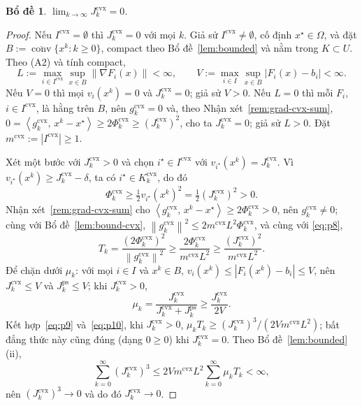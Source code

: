 \documentclass[]{interact}
\theoremstyle{plain}
\newtheorem{lemma}[theorem]{Bổ đề}
\theoremstyle{definition}
\theoremstyle{remark}
\newcommand{\norm}[1]{\left\lVert #1 \right\rVert}
\newcommand{\abs}[1]{\left\lvert #1 \right\rvert}
\newcommand{\inner}[2]{\left\langle #1,\, #2 \right\rangle}
\DeclareMathOperator{\conv}{conv}
\newcommand{\cvx}{\mathrm{cvx}}
\newcommand{\ps}{\mathrm{ps}}
\begin{document}
\begin{lemma}\label{lem:jcvx0}
$\displaystyle\lim_{k\to\infty}J^{\cvx}_k=0$.
\end{lemma}
\begin{proof}
Nếu $I^{\cvx}=\emptyset$ thì $J^{\cvx}_k=0$ với mọi $k$. Giả sử $I^{\cvx}\ne\emptyset$, cố định
$x^\star\in\Omega$, và đặt $B:=\overline{\conv}\{x^k:k\ge0\}$, compact theo Bổ đề~\ref{lem:bounded} và nằm
trong $K\subset U$. Theo (A2) và
tính compact,
\[
L:=\max_{i\in I^{\cvx}}\sup_{x\in B}\norm{\nabla F_i(x)}<\infty,\qquad
V:=\max_{i\in I}\sup_{x\in B}\abs{F_i(x)-b_i}<\infty.
\]
Nếu $V=0$ thì mọi $v_i(x^k)=0$ và
$J^{\cvx}_k=0$; giả sử $V>0$. Nếu $L=0$ thì mỗi $F_i$, $i\in I^{\cvx}$, là hằng trên
$B$, nên $g^{\cvx}_k=0$ và, theo Nhận xét~\ref{rem:grad-cvx-sum},
$0=\inner{g^{\cvx}_k}{x^k-x^\star}\ge 2\Phi^{\cvx}_k\ge(J^{\cvx}_k)^2$, cho ta
$J^{\cvx}_k=0$; giả sử $L>0$. Đặt $m^{\cvx}:=\abs{I^{\cvx}}\ge1$.

Xét một bước với $J^{\cvx}_k>0$ và chọn $i^\star\in I^{\cvx}$ với
$v_{i^\star}(x^k)=J^{\cvx}_k$. Vì $v_{i^\star}(x^k)\ge J^{\cvx}_k-\delta$, ta có
$i^\star\in K^{\cvx}_k$, do đó
\begin{equation}\label{eq:p8}
\Phi^{\cvx}_k\ge\tfrac12 v_{i^\star}(x^k)^2=\tfrac12(J^{\cvx}_k)^2>0 .
\end{equation}
Nhận xét~\ref{rem:grad-cvx-sum} cho
$\inner{g^{\cvx}_k}{x^k-x^\star}\ge2\Phi^{\cvx}_k>0$, nên $g^{\cvx}_k\ne0$; cùng với
Bổ đề~\ref{lem:bound-cvx}, $\norm{g^{\cvx}_k}^2\le2m^{\cvx}L^2\Phi^{\cvx}_k$, và cùng với
\eqref{eq:p8},
\begin{equation}\label{eq:p9}
T_k=\frac{(2\Phi^{\cvx}_k)^2}{\norm{g^{\cvx}_k}^2}\ge\frac{2\Phi^{\cvx}_k}{m^{\cvx}L^2}\ge\frac{(J^{\cvx}_k)^2}{m^{\cvx}L^2}.
\end{equation}
Để chặn dưới $\mu_k$: với mọi $i\in I$ và $x^k\in B$,
$v_i(x^k)\le\abs{F_i(x^k)-b_i}\le V$, nên $J^{\cvx}_k\le V$ và $J^{\ps}_k\le V$; khi
$J^{\cvx}_k>0$,
\begin{equation}\label{eq:p10}
\mu_k=\frac{J^{\cvx}_k}{J^{\cvx}_k+J^{\ps}_k}\ge\frac{J^{\cvx}_k}{2V}.
\end{equation}
Kết hợp~\eqref{eq:p9} và~\eqref{eq:p10}, khi $J^{\cvx}_k>0$,
$\mu_k T_k\ge(J^{\cvx}_k)^3/(2Vm^{\cvx}L^2)$; bất đẳng thức này cũng đúng (dạng $0\ge0$) khi
$J^{\cvx}_k=0$. Theo Bổ đề~\ref{lem:bounded}(ii),
\begin{equation}\label{eq:p12}
\sum_{k=0}^\infty(J^{\cvx}_k)^3\le 2Vm^{\cvx}L^2\sum_{k=0}^\infty\mu_k T_k<\infty,
\end{equation}
nên $(J^{\cvx}_k)^3\to0$ và do đó $J^{\cvx}_k\to0$.
\end{proof}
\end{document}

